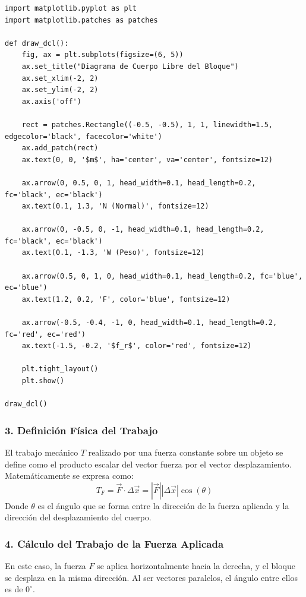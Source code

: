 \documentclass[12pt, a4paper]{article}
\begin{document}
\begin{lstlisting}
import matplotlib.pyplot as plt
import matplotlib.patches as patches

def draw_dcl():
    fig, ax = plt.subplots(figsize=(6, 5))
    ax.set_title("Diagrama de Cuerpo Libre del Bloque")
    ax.set_xlim(-2, 2)
    ax.set_ylim(-2, 2)
    ax.axis('off')
    
    rect = patches.Rectangle((-0.5, -0.5), 1, 1, linewidth=1.5, edgecolor='black', facecolor='white')
    ax.add_patch(rect)
    ax.text(0, 0, '$m$', ha='center', va='center', fontsize=12)
    
    ax.arrow(0, 0.5, 0, 1, head_width=0.1, head_length=0.2, fc='black', ec='black')
    ax.text(0.1, 1.3, 'N (Normal)', fontsize=12)
    
    ax.arrow(0, -0.5, 0, -1, head_width=0.1, head_length=0.2, fc='black', ec='black')
    ax.text(0.1, -1.3, 'W (Peso)', fontsize=12)
    
    ax.arrow(0.5, 0, 1, 0, head_width=0.1, head_length=0.2, fc='blue', ec='blue')
    ax.text(1.2, 0.2, 'F', color='blue', fontsize=12)
    
    ax.arrow(-0.5, -0.4, -1, 0, head_width=0.1, head_length=0.2, fc='red', ec='red')
    ax.text(-1.5, -0.2, '$f_r$', color='red', fontsize=12)

    plt.tight_layout()
    plt.show()

draw_dcl()
\end{lstlisting}

\subsubsection*{3. Definición Física del Trabajo}
El trabajo mecánico $T$ realizado por una fuerza constante sobre un objeto se define como el producto escalar del vector fuerza por el vector desplazamiento. Matemáticamente se expresa como:
$$ T_F = \vec{F} \cdot \Delta\vec{x} = |\vec{F}| |\Delta\vec{x}| \cos(\theta) $$
Donde $\theta$ es el ángulo que se forma entre la dirección de la fuerza aplicada y la dirección del desplazamiento del cuerpo.

\subsubsection*{4. Cálculo del Trabajo de la Fuerza Aplicada}
En este caso, la fuerza $F$ se aplica horizontalmente hacia la derecha, y el bloque se desplaza en la misma dirección. Al ser vectores paralelos, el ángulo entre ellos es de $0^\circ$.
\end{document}
